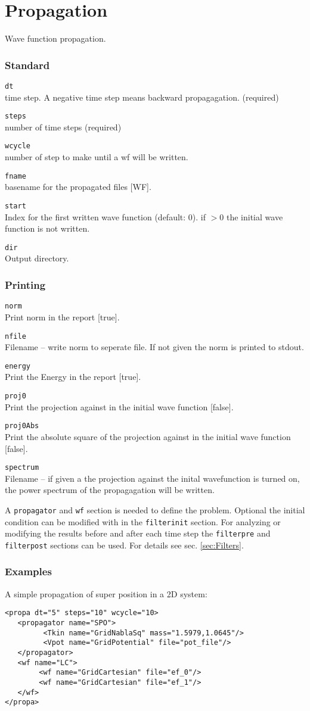 \documentclass[a4paper,12pt]{scrbook}
\newcommand{\option}[2]{\item \texttt{#1}\\ #2}
\begin{document}
\section{Propagation}
Wave function propagation.
\subsubsection*{Standard}
\begin{options}
\option{dt}{time step. A negative time step means backward propagagation. (required)}
\option{steps}{number of time steps (required)}
\option{wcycle}{number of step to make until a wf will be written.}
\option{fname}{basename for the propagated files [WF].}
\option{start}{Index for the first written wave function (default: 0). if $>0$ the initial wave function is not written.}
\option{dir}{Output directory.}
\end{options}

\subsubsection*{Printing}
\begin{options}
\option{norm}{Print norm in the report [true].}
\option{nfile}{Filename -- write norm to seperate file. If not given the norm is printed to stdout.}
\option{energy}{Print the Energy in the report [true].}
\option{proj0}{Print the projection against in the initial wave function [false].}
\option{proj0Abs}{Print the absolute square of the projection against in the initial wave function [false].}
\option{spectrum}{Filename -- if given a the projection against the inital wavefunction is turned on, the power spectrum of the propagagation will be written.}
\end{options}

A \verb|propagator| and \verb|wf| section is needed to define the problem. Optional the initial condition can
be modified with in the \verb|filterinit| section. For analyzing or modifying the results before and after each time step
the \verb|filterpre| and \verb|filterpost| sections can be used. For details see sec. \ref{sec:Filters}.

\subsubsection*{Examples}
A simple propagation of super position in a 2D system:
\begin{verbatim}
<propa dt="5" steps="10" wcycle="10>
   <propagator name="SPO">
         <Tkin name="GridNablaSq" mass="1.5979,1.0645"/>
         <Vpot name="GridPotential" file="pot_file"/>
   </propagator>
   <wf name="LC">
        <wf name="GridCartesian" file="ef_0"/>
        <wf name="GridCartesian" file="ef_1"/>
   </wf>
</propa> 
\end{verbatim}
\end{document}
